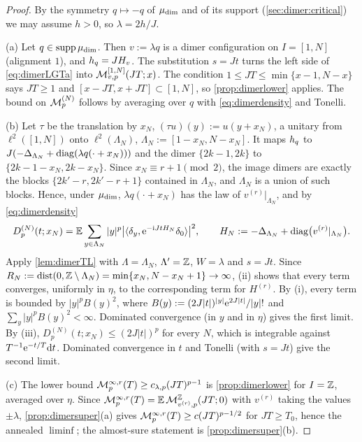 \begin{proof}
By the symmetry $q\mapsto-q$ of $\mu_{\mathrm{dim}}$ and of its support (\cref{sec:dimer:critical}) we may assume
$h>0$, so $\lambda=2h/J$.

(a) Let $q\in\operatorname{supp}\mu_{\mathrm{dim}}$.  Then $v:=\lambda q$ is a dimer configuration on $I=[1,N]$ (alignment $1$),
and $h_{q}=JH_v$.  The substitution $s=Jt$ turns the left side of \eqref{eq:dimerLGTa} into
$\mathcal{M}^{[1,N]}_{v,p}(JT;x)$.  The condition $1\le JT\le\min\{x-1,N-x\}$ says $JT\ge1$ and
$[x-JT,x+JT]\subset[1,N]$, so \cref{prop:dimerlower} applies.  The bound on $\mathcal{M}^{(N)}_p$ follows by
averaging over $q$ with \eqref{eq:dimerdensity} and Tonelli.

(b) Let $\tau$ be the translation by $x_N$, $(\tau u)(y):=u(y+x_N)$, a unitary from $\ell^2([1,N])$ onto
$\ell^2(\Lambda_N)$, $\Lambda_N:=[1-x_N,N-x_N]$.  It maps $h_{q}$ to $J(-\Delta_{\Lambda_N}+\operatorname{diag}(\lambda q(\cdot+x_N)))$
and the dimer $\{2k-1,2k\}$ to $\{2k-1-x_N,2k-x_N\}$.  Since $x_N\equiv r+1\pmod2$, the image dimers are
exactly the blocks $\{2k'-r,2k'-r+1\}$ contained in $\Lambda_N$, and $\Lambda_N$ is a union of such
blocks.  Hence, under $\mu_{\mathrm{dim}}$, $\lambda q(\cdot+x_N)$ has the law of $v^{(r)}|_{\Lambda_N}$, and by
\eqref{eq:dimerdensity}
\[
  D^{(N)}_p(t;x_N)=\mathbb{E}\sum_{y\in\Lambda_N}|y|^p\bigl|\langle\delta_y,\mathrm{e}^{-\mathrm{i} JtH_N}\delta_0\rangle\bigr|^2,\qquad
  H_N:=-\Delta_{\Lambda_N}+\operatorname{diag}\bigl(v^{(r)}|_{\Lambda_N}\bigr).
\]
Apply \cref{lem:dimerTL} with $\Lambda=\Lambda_N$, $\Lambda'=\mathbb{Z}$, $W=\lambda$ and $s=Jt$.  Since
$R_N:=\operatorname{dist}(0,\mathbb{Z}\setminus\Lambda_N)=\min\{x_N,N-x_N+1\}\to\infty$, (ii) shows that every term converges,
uniformly in $\eta$, to the corresponding term for $H^{(r)}$.  By (i), every term is bounded by
$|y|^pB(y)^2$, where $B(y):=(2J|t|)^{|y|}\mathrm{e}^{2J|t|}/|y|!$ and $\sum_y|y|^pB(y)^2<\infty$.  Dominated
convergence (in $y$ and in $\eta$) gives the first limit.  By (iii),
$D^{(N)}_p(t;x_N)\le(2J|t|)^p$ for every $N$, which is integrable against $T^{-1}\mathrm{e}^{-t/T}\mathrm{d} t$.
Dominated convergence in $t$ and Tonelli (with $s=Jt$) give the second limit.

(c) The lower bound $\mathcal{M}^{\infty,r}_p(T)\ge c_{\lambda,p}(JT)^{p-1}$ is \cref{prop:dimerlower} for
$I=\mathbb{Z}$, averaged over $\eta$.  Since $\mathcal{M}^{\infty,r}_p(T)=\mathbb{E}\,\mathcal{M}^{\mathbb{Z}}_{v^{(r)},p}(JT;0)$ with $v^{(r)}$ taking the values
$\pm\lambda$, \cref{prop:dimersuper}(a) gives $\mathcal{M}^{\infty,r}_p(T)\ge c(JT)^{p-1/2}$ for $JT\ge T_0$, hence the annealed
$\liminf$; the almost-sure statement is \cref{prop:dimersuper}(b).


\end{proof}
